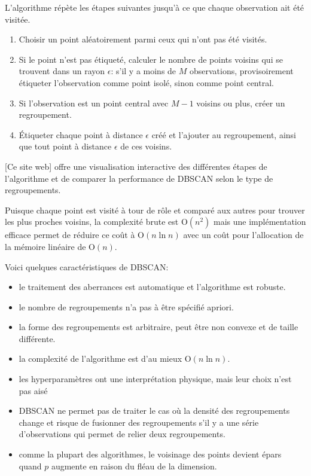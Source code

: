 \documentclass[
  11pt,
  letterpaper,
]{book}
\providecommand{\tightlist}{%
  \setlength{\itemsep}{0pt}\setlength{\parskip}{0pt}}\usepackage{longtable,booktabs,array}
\theoremstyle{definition}
\theoremstyle{remark}
\begin{document}
L'algorithme répète les étapes suivantes jusqu'à ce que chaque
observation ait été visitée.

\begin{enumerate}
\def\labelenumi{\arabic{enumi}.}
\tightlist
\item
  Choisir un point aléatoirement parmi ceux qui n'ont pas été visités.
\item
  Si le point n'est pas étiqueté, calculer le nombre de points voisins
  qui se trouvent dans un rayon \(\epsilon\): s'il y a moins de \(M\)
  observations, provisoirement étiqueter l'observation comme point
  isolé, sinon comme point central.
\item
  Si l'observation est un point central avec \(M-1\) voisins ou plus,
  créer un regroupement.
\item
  Étiqueter chaque point à distance \(\epsilon\) créé et l'ajouter au
  regroupement, ainsi que tout point à distance \(\epsilon\) de ces
  voisins.
\end{enumerate}

{[}Ce site web{]} offre une visualisation interactive des différentes
étapes de l'algorithme et de comparer la performance de DBSCAN selon le
type de regroupements.

Puisque chaque point est visité à tour de rôle et comparé aux autres
pour trouver les plus proches voisins, la complexité brute est
\(\mathrm{O}(n^2)\) mais une implémentation efficace permet de réduire
ce coût à \(\mathrm{O}(n\ln n)\) avec un coût pour l'allocation de la
mémoire linéaire de \(\mathrm{O}(n)\).

Voici quelques caractéristiques de DBSCAN:

\begin{itemize}
\tightlist
\item
  le traitement des aberrances est automatique et l'algorithme est
  robuste.
\item
  le nombre de regroupements n'a pas à être spécifié apriori.
\item
  la forme des regroupements est arbitraire, peut être non convexe et de
  taille différente.
\item
  la complexité de l'algorithme est d'au mieux \(\mathrm{O}(n\ln n)\).
\item
  les hyperparamètres ont une interprétation physique, mais leur choix
  n'est pas aisé
\item
  DBSCAN ne permet pas de traiter le cas où la densité des regroupements
  change et risque de fusionner des regroupements s'il y a une série
  d'observations qui permet de relier deux regroupements.
\item
  comme la plupart des algorithmes, le voisinage des points devient
  épars quand \(p\) augmente en raison du fléau de la dimension.
\end{itemize}
\end{document}
